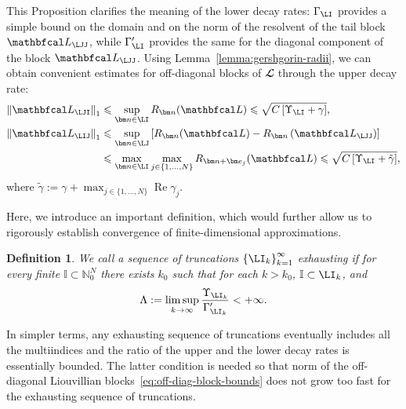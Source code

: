 \documentclass{SciPost}
\renewcommand{\Re}{\operatorname{Re}}
\newtheorem{definition}{Definition}
\begin{document}
This Proposition clarifies the meaning of the lower decay rates: $\Gamma_{\LI}$ provides a simple bound on the domain and on the norm of the resolvent of the tail block $\mathbfcal L_\LJJ$, while $\Gamma_\LI'$ provides the same for the diagonal component of the block $\mathbfcal L_\LJJ$. Using Lemma~\ref{lemma:gershgorin-radii}, we can obtain convenient estimates for off-diagonal blocks of $\mathbfcal L$ through the upper decay rate:
\begin{equation}
    \begin{aligned}
        \left \| \mathbfcal L_\LJI \right \|_1
        &\leqslant
        \sup_{\bm n \in \LI} R_{\bm n}(\mathbfcal L)
        \leqslant
        \sqrt{C \left[\Upsilon_\LI + \gamma\right]}, \\
        \left \| \mathbfcal L_\LIJ \right \|_1
        &\leqslant
        \sup_{\bm n \in \LJ}
        \left[
            R_{\bm n}(\mathbfcal L) - R_{\bm n}\left(\mathbfcal L_\LJJ\right)
        \right] \\
        &\leqslant
        \max_{\bm n \in \LI}
        \max_{j \in \{1, \ldots, N\}}
        R_{\bm n + \bm e_j}(\mathbfcal L)
        \leqslant
        \sqrt{C\left[\Upsilon_\LI + \tilde \gamma\right]},
    \end{aligned}
    \label{eq:off-diag-block-bounds}
\end{equation}
where
$\tilde \gamma
:=
\gamma + \max_{j \in \{1, \ldots, N\}} \Re \gamma_j$.

Here, we introduce an important definition, which would further allow us to rigorously establish convergence of finite-dimensional approximations.
\begin{definition}
    We call a sequence of truncations $\left\{\LI_{k}\right\}_{k=1}^\infty$ \emph{exhausting}
    if for every finite $\mathbb I \subset \mathbb N_0^N$ there exists $k_0$ such that for each $k > k_0$, $\mathbb I \subset \LI_k$, and
    \begin{equation}
        \Lambda
        :=
        \limsup_{k \to \infty}
        \frac{\Upsilon_{\LI_k}}{\Gamma_{\LI_k}'}
        < +\infty.
    \end{equation}
\end{definition}
In simpler terms, any exhausting sequence of truncations eventually includes all the multiindices and the ratio of the upper and the lower decay rates is essentially bounded. The latter condition is needed so that norm of the off-diagonal Liouvillian blocks~\ref{eq:off-diag-block-bounds} does not grow too fast for the exhausting sequence of truncations.
\end{document}
